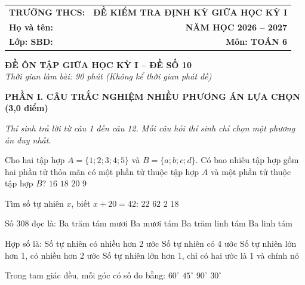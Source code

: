 \documentclass[12pt,a4paper]{article}
\begin{document}
\noindent
\begin{tabularx}{\linewidth}{X r}
\textbf{TRƯỜNG THCS: \dotfill} & \textbf{ĐỀ KIỂM TRA ĐỊNH KỲ GIỮA HỌC KỲ I} \\
\textbf{Họ và tên: \dotfill} & \textbf{NĂM HỌC 2026 -- 2027} \\
\textbf{Lớp: \dotfill \quad SBD: \dotfill} & \textbf{Môn: TOÁN 6} \\
\hline
\end{tabularx}
\vspace{2mm}

\begin{center}
  \textbf{\large ĐỀ ÔN TẬP GIỮA HỌC KỲ I -- ĐỀ SỐ 10}\\
  \textit{Thời gian làm bài: 90 phút (Không kể thời gian phát đề)}
\end{center}
\vspace{1mm}

\noindent\textbf{\large PHẦN I. CÂU TRẮC NGHIỆM NHIỀU PHƯƠNG ÁN LỰA CHỌN (3,0 điểm)}

\textit{Thí sinh trả lời từ câu 1 đến câu 12. Mỗi câu hỏi thí sinh chỉ chọn một phương án duy nhất.}

\vspace{1mm}
\begin{ex}
Cho hai tập hợp $A = \{1; 2; 3; 4; 5\}$ và $B = \{a; b; c; d\}$. Có bao nhiêu tập hợp gồm hai phần tử thỏa mãn có một phần tử thuộc tập hợp $A$ và một phần tử thuộc tập hợp $B$?
\choice
{$16$}
{$18$}
{\True $20$}
{$9$}
\end{ex}

\begin{ex}
Tìm số tự nhiên $x$, biết $x + 20 = 42$:
\choice
{\True $22$}
{$62$}
{$2$}
{$18$}
\end{ex}

\begin{ex}
Số $308$ đọc là:
\choice
{Ba trăm tám mươi}
{Ba mươi tám}
{\True Ba trăm linh tám}
{Ba linh tám}
\end{ex}

\begin{ex}
Hợp số là:
\choice
{Số tự nhiên có nhiều hơn 2 ước}
{Số tự nhiên có 4 ước}
{\True Số tự nhiên lớn hơn 1, có nhiều hơn 2 ước}
{Số tự nhiên lớn hơn 1, chỉ có hai ước là 1 và chính nó}
\end{ex}

\begin{ex}
Trong tam giác đều, mỗi góc có số đo bằng:
\choice
{\True $60^\circ$}
{$45^\circ$}
{$90^\circ$}
{$30^\circ$}
\end{ex}
\end{document}
